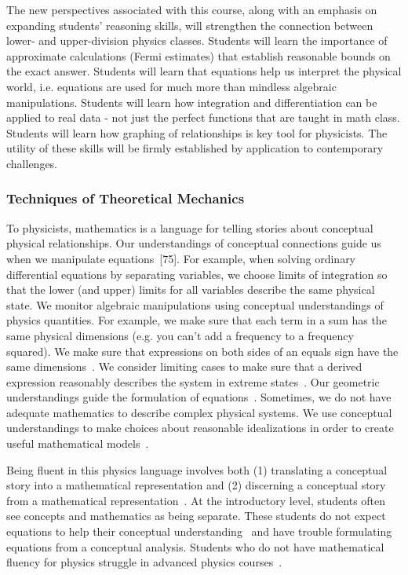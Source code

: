 \documentclass[english,aps,pra,reprint,noshowpacs,superscriptaddress]{revtex4-1}
\begin{document}
The new perspectives associated with this course, along with an
emphasis on expanding students' reasoning skills, will strengthen the
connection between lower- and upper-division physics classes. Students
will learn the importance of approximate calculations (Fermi
estimates) that establish reasonable bounds on the exact
answer. Students will learn that equations help us interpret the
physical world, i.e. equations are used for much more than mindless
algebraic manipulations.  Students will learn how integration and
differentiation can be applied to real data - not just the perfect
functions that are taught in math class. Students will learn how
graphing of relationships is key tool for physicists. The utility of
these skills will be firmly established by application to contemporary
challenges.

\subsubsection{Techniques of Theoretical Mechanics}

To physicists, mathematics is a language for telling stories about
conceptual physical relationships.  Our understandings of conceptual
connections guide us when we manipulate
equations~\cite{gire2008resources, bing2007cognitive,
  wittmann2015mathematical}[75].  For example, when solving ordinary
differential equations by separating variables, we choose limits of
integration so that the lower (and upper) limits for all variables
describe the same physical state.  We monitor algebraic manipulations
using conceptual understandings of physics quantities. For example, we
make sure that each term in a sum has the same physical dimensions
(e.g. you can't add a frequency to a frequency squared). We make sure
that expressions on both sides of an equals sign have the same
dimensions~\cite{lenz2016dimensional}. We consider limiting cases to
make sure that a derived expression reasonably describes the system in
extreme states~\cite{singh2002physical}. Our geometric understandings
guide the formulation of equations~\cite{gire2014arrows}. Sometimes,
we do not have adequate mathematics to describe complex physical
systems. We use conceptual understandings to make choices about
reasonable idealizations in order to create useful mathematical
models~\cite{bing2007cognitive}.

Being fluent in this physics language involves both (1) translating a
conceptual story into a mathematical representation and (2) discerning
a conceptual story from a mathematical
representation~\cite{tuminaro2007elements}. At the introductory level,
students often see concepts and mathematics as being separate. These
students do not expect equations to help their conceptual
understanding~\cite{adams2006new, redish1998expectations} and have
trouble formulating equations from a conceptual analysis. Students who
do not have mathematical fluency for physics struggle in advanced
physics courses~\cite{manogue2009cognitive}.
\end{document}
